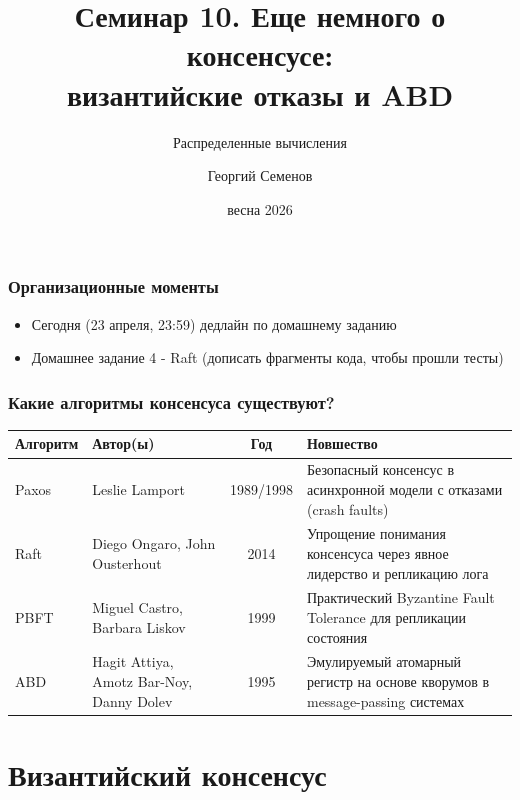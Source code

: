 \documentclass{beamer}
\title{Семинар 10. Еще немного о консенсусе: \\ византийские отказы и ABD}
\subtitle{Распределенные вычисления}
\author{Георгий Семенов}
\institute{Институт прикладных компьютерных наук \\ Университет ИТМО}
\date{весна 2026}
\begin{document}
\frame{\titlepage}

\begin{frame}
\frametitle{Организационные моменты}

\begin{itemize}
  \item Сегодня (23 апреля, 23:59) дедлайн по домашнему заданию 
  \item Домашнее задание 4 - Raft (дописать фрагменты кода, чтобы прошли тесты)
\end{itemize}

\end{frame}


\begin{frame}
\frametitle{Какие алгоритмы консенсуса существуют?}


\begin{center}
\small
\begin{tabular}{>{\raggedright\arraybackslash}p{1.5cm} >{\raggedright\arraybackslash}p{3.0cm} c >{\raggedright\arraybackslash}p{4.0cm}}
\toprule
\textbf{Алгоритм} & \textbf{Автор(ы)} & \textbf{Год} & \textbf{Новшество} \\
\midrule
Paxos & Leslie Lamport & 1989/1998 & Безопасный консенсус в асинхронной модели с отказами (crash faults) \\
Raft & Diego Ongaro, John Ousterhout & 2014 & Упрощение понимания консенсуса через явное лидерство и репликацию лога \\
PBFT & Miguel Castro, Barbara Liskov & 1999 & Практический Byzantine Fault Tolerance для репликации состояния \\
ABD & Hagit Attiya, Amotz Bar-Noy, Danny Dolev & 1995 & Эмулируемый атомарный регистр на основе кворумов в message-passing системах \\
\bottomrule
\end{tabular}
\end{center}


\end{frame}


\section{Византийский консенсус}
\end{document}
